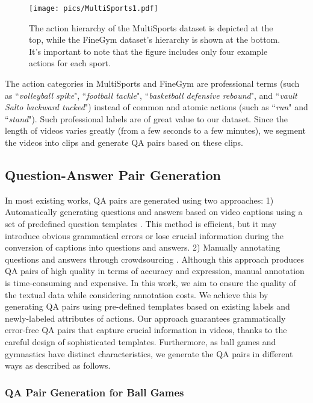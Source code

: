 \begin{figure}[tbp]
\centering
\texttt{[image: pics/MultiSports1.pdf]}
\caption{The action hierarchy of the MultiSports dataset is depicted at the top, while the FineGym dataset's hierarchy is shown at the bottom. It's important to note that the figure includes only four example actions for each sport.}
\label{ms}
\end{figure}

The action categories in MultiSports and FineGym are professional terms (such as ``\textit{volleyball spike}", ``\textit{football tackle}", ``\textit{basketball defensive rebound}", and ``\textit{vault Salto backward tucked}") instead of common and atomic actions (such as ``\textit{run}" and ``\textit{stand}"). Such professional labels are of great value to our dataset.
Since the length of videos varies greatly (from a few seconds to a few minutes), we segment the videos into clips and generate QA pairs based on these clips.

\subsection{Question-Answer Pair Generation}

In most existing works, QA pairs are generated using two approaches:
1) Automatically generating questions and answers based on video captions using a set of predefined question templates \citep{jang2017tgif, xu2017video, yang2021just}. This method is efficient, but it may introduce obvious grammatical errors or lose crucial information during the conversion of captions into questions and answers.
2) Manually annotating questions and answers through crowdsourcing \citep{xiao2021next, yu2019activitynet, garcia2020knowit}. Although this approach produces QA pairs of high quality in terms of accuracy and expression, manual annotation is time-consuming and expensive.
In this work, we aim to ensure the quality of the textual data while considering annotation costs. We achieve this by generating QA pairs using pre-defined templates based on existing labels and newly-labeled attributes of actions. Our approach guarantees grammatically error-free QA pairs that capture crucial information in videos, thanks to the careful design of sophisticated templates. Furthermore, as ball games and gymnastics have distinct characteristics, we generate the QA pairs in different ways as described as follows.

\subsubsection{QA Pair Generation for Ball Games}

